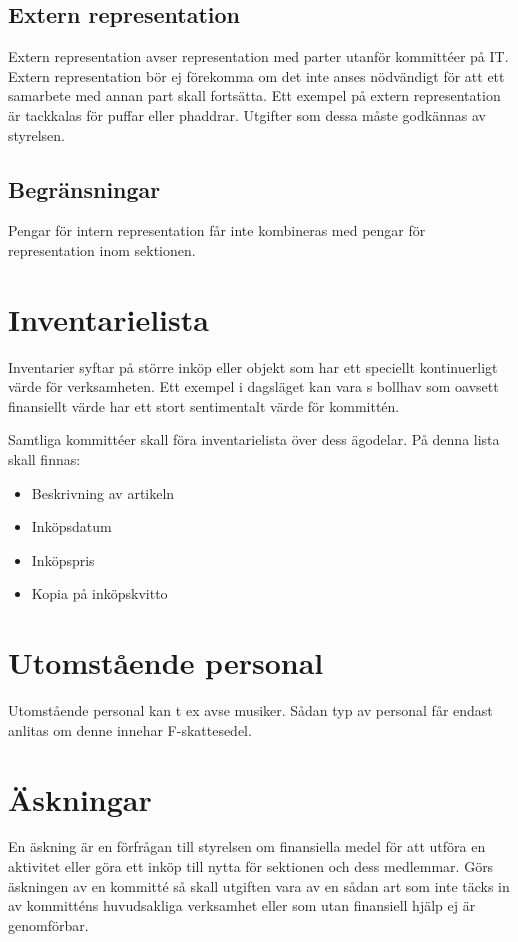 \documentclass[11pt, includeaddress]{classes/cthit}
\begin{document}
\subsection{Extern representation}
Extern representation avser representation med parter utanför kommittéer på IT. Extern representation bör ej förekomma om det inte anses nödvändigt för att ett samarbete med annan part skall fortsätta. Ett exempel på extern representation är tackkalas för puffar eller phaddrar. Utgifter som dessa måste godkännas av styrelsen.

\subsection{Begränsningar}
Pengar för intern representation får inte kombineras med pengar för representation inom sektionen.


\section{Inventarielista}
Inventarier syftar på större inköp eller objekt som har ett speciellt kontinuerligt värde för verksamheten. Ett exempel i dagsläget kan vara \NOLLKIT{}s bollhav som oavsett finansiellt värde har ett stort sentimentalt värde för kommittén.

Samtliga kommittéer skall föra inventarielista över dess ägodelar. På denna lista skall finnas:

\begin{itemize}
	\item Beskrivning av artikeln
	\item Inköpsdatum
	\item Inköpspris
	\item Kopia på inköpskvitto
\end{itemize}


\section{Utomstående personal}
Utomstående personal kan t ex avse musiker. Sådan typ av personal får endast anlitas om denne innehar F-skattesedel.

\section{Äskningar}
En äskning är en förfrågan till styrelsen om finansiella medel för att utföra en aktivitet eller göra ett inköp till nytta för sektionen och dess medlemmar. Görs äskningen av en kommitté så skall utgiften vara av en sådan art som inte täcks in av kommitténs huvudsakliga verksamhet eller som utan finansiell hjälp ej är genomförbar. \\
\end{document}
